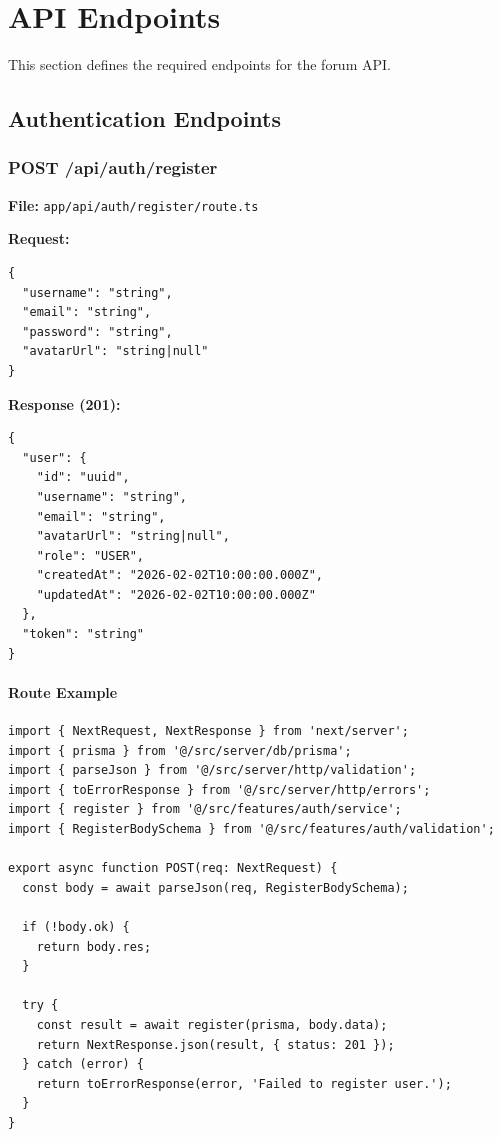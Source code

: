 \documentclass[11pt,a4paper]{article}
\begin{document}
\section{API Endpoints}

This section defines the required endpoints for the forum API.

\subsection{Authentication Endpoints}

\subsubsection{POST /api/auth/register}
\textbf{File:} \texttt{app/api/auth/register/route.ts}

\textbf{Request:}
\begin{lstlisting}
{
  "username": "string",
  "email": "string",
  "password": "string",
  "avatarUrl": "string|null"
}
\end{lstlisting}

\textbf{Response (201):}
\begin{lstlisting}
{
  "user": {
    "id": "uuid",
    "username": "string",
    "email": "string",
    "avatarUrl": "string|null",
    "role": "USER",
    "createdAt": "2026-02-02T10:00:00.000Z",
    "updatedAt": "2026-02-02T10:00:00.000Z"
  },
  "token": "string"
}
\end{lstlisting}

\paragraph{Route Example}
\begin{lstlisting}
import { NextRequest, NextResponse } from 'next/server';
import { prisma } from '@/src/server/db/prisma';
import { parseJson } from '@/src/server/http/validation';
import { toErrorResponse } from '@/src/server/http/errors';
import { register } from '@/src/features/auth/service';
import { RegisterBodySchema } from '@/src/features/auth/validation';

export async function POST(req: NextRequest) {
  const body = await parseJson(req, RegisterBodySchema);

  if (!body.ok) {
    return body.res;
  }

  try {
    const result = await register(prisma, body.data);
    return NextResponse.json(result, { status: 201 });
  } catch (error) {
    return toErrorResponse(error, 'Failed to register user.');
  }
}
\end{lstlisting}
\end{document}
